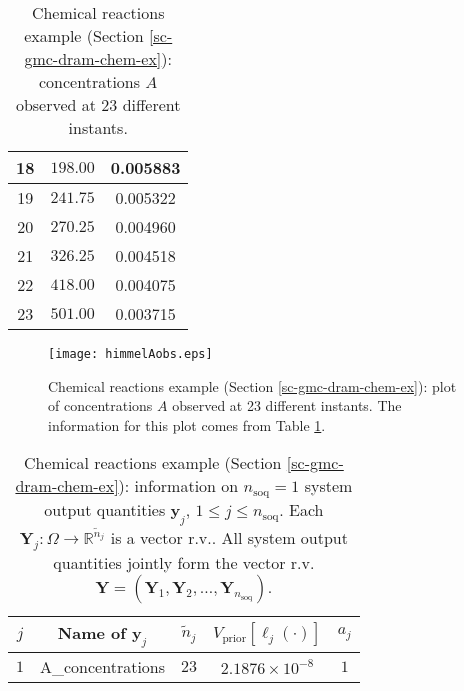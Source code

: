 \begin{table}[h!]
\begin{center}
\begin{tabular}{|c|c|c|}
\hline
18  & $198.00$             & 0.005883 \\
\hline
19  & $241.75$             & 0.005322 \\
\hline
20  & $270.25$             & 0.004960 \\
\hline
21  & $326.25$             & 0.004518 \\
\hline
22  & $418.00$             & 0.004075 \\
\hline
23  & $501.00$             & 0.003715 \\
\hline
\end{tabular}
\caption{Chemical reactions example (Section \ref{sc-gmc-dram-chem-ex}):
concentrations $A$ observed at 23 different instants.
}
\label{tab-dram-chem-ex-sys-y1-obs}
\end{center}
\end{table}

\begin{figure}[h!]
\begin{center}
\texttt{[image: himmelAobs.eps]}
\end{center}
\caption{Chemical reactions example (Section \ref{sc-gmc-dram-chem-ex}):
plot of concentrations $A$ observed at 23 different instants.
The information for this plot comes from Table \ref{tab-dram-chem-ex-sys-y1-obs}.
}
\label{fig-dram-chem-ex-sys-y1-obs}
\end{figure}

\begin{table}[h!]
\begin{center}
\begin{tabular}{|c|c|c|c|c|}
\hline
 $j$      & Name of $\mathbf{y}_j$ & ${\tilde{n}_j}$ & $V_{\text{prior}}[\ell_j(\cdot)]$ & $a_j$ \\
\hline
\hline
 $1$      & A\_concentrations      & $23$            & $2.1876\times 10^{-8}$            & $1$   \\
\hline
\end{tabular}
\caption{Chemical reactions example (Section \ref{sc-gmc-dram-chem-ex}):
information on $n_{\text{soq}}=1$ system output quantities $\mathbf{y}_j$, $1\leqslant j\leqslant n_{\text{soq}}$.
Each $\mathbf{Y}_j:\Omega\rightarrow\mathbb{R}^{{\tilde{n}}_j}$ is a vector r.v..
All system output quantities jointly form the vector r.v. $\mathbf{Y}=(\mathbf{Y}_1,\mathbf{Y}_2,\ldots,\mathbf{Y}_{n_{\text{soq}}})$.
}
\label{tab-dram-chem-ex-soq}
\end{center}
\end{table}

